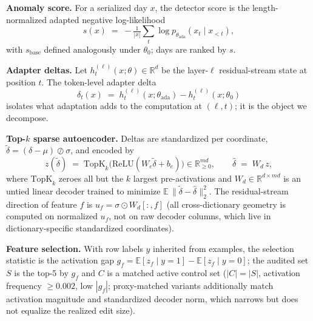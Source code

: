 \documentclass[10pt]{article} %
\begin{document}
\textbf{Anomaly score.}
For a serialized day $x$, the detector score is the length-normalized
adapted negative log-likelihood
\begin{equation}
s(x) \;=\; -\tfrac{1}{|x|}\textstyle\sum_{t} \log
p_{\theta_{\mathrm{ada}}}\!\left(x_t \mid x_{<t}\right),
\end{equation}
with $s_{\mathrm{base}}$ defined analogously under $\theta_0$; days are
ranked by $s$.

\textbf{Adapter deltas.}
Let $h^{(\ell)}_t(x;\theta) \in \mathbb{R}^{d}$ be the layer-$\ell$
residual-stream state at position $t$. The token-level adapter delta
\begin{equation}
\delta_t(x) \;=\; h^{(\ell)}_t(x;\theta_{\mathrm{ada}}) -
h^{(\ell)}_t(x;\theta_0)
\end{equation}
isolates what adaptation adds to the computation at $(\ell, t)$; it is the
object we decompose.

\textbf{Top-$k$ sparse autoencoder.}
Deltas are standardized per coordinate,
$\tilde{\delta} = (\delta - \mu) \oslash \sigma$, and encoded by
\begin{equation}
z(\tilde{\delta}) \;=\; \mathrm{TopK}_{k}\!\bigl(\mathrm{ReLU}(W_e
\tilde{\delta} + b_e)\bigr) \in \mathbb{R}_{\geq 0}^{m d}, \qquad
\hat{\delta} \;=\; W_d\, z,
\end{equation}
where $\mathrm{TopK}_k$ zeroes all but the $k$ largest pre-activations and
$W_d \in \mathbb{R}^{d \times md}$ is an untied linear decoder trained to
minimize $\mathbb{E}\,\|\tilde{\delta} - \hat{\delta}\|_2^2$. The
residual-stream direction of feature $f$ is $u_f = \sigma \odot
W_d[:,f]$ (all cross-dictionary geometry is computed on normalized $u_f$,
not on raw decoder columns, which live in dictionary-specific standardized
coordinates).

\textbf{Feature selection.}
With row labels $y$ inherited from examples, the selection statistic is the
activation gap $g_f = \mathbb{E}[z_f \mid y{=}1] - \mathbb{E}[z_f \mid
y{=}0]$; the audited set $S$ is the top-5 by $g_f$ and $C$ is a matched
active control set ($|C|=|S|$, activation frequency $\geq 0.002$, low
$|g_f|$; proxy-matched variants additionally match activation magnitude and
standardized decoder norm, which narrows but does not equalize the realized
edit size).
\end{document}
